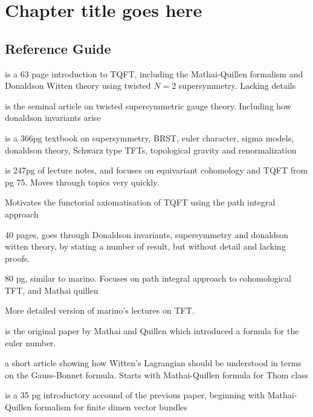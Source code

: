 
\chapter{Chapter title goes here}
\label{chapter1}
\section{Reference Guide}
\cite{cernTQFT} is a 63 page introduction to TQFT, including the Mathai-Quillen
formalism and Donaldson Witten theory using twisted $N=2$ supersymmetry.
Lacking details

\cite{wittenTQFT} is the seminal article on twisted supersymmetric gauge theory.
Including how donaldson invariants arise

\cite{birminghamTFT} is a 366pg textbook on supersymmetry, BRST, euler
character, sigma models, donaldson theory, Schwarz type TFTs, topological
gravity and renormalization

\cite{cordes95} is 247pg of lecture notes, and focuses on equivariant cohomology
and TQFT from pg 75. Moves through topics very quickly.

\cite{axiomTQFTintro} Motivates the functorial axiomatisation of TQFT using the
path integral approach

\cite{marino} 40 pages, goes through Donaldson invariants, supersymmetry and donaldson
witten theory, by stating a number of result, but without detail and lacking
proofs. 

\cite{moore} 80 pg, similar to marino. Focuses on path integral approach to
cohomological TFT, and Mathai quillen

\cite{TQFTbook} More detailed version of marino's lectures on TFT. 

\cite{MQformula} is the original paper by Mathai and Quillen which introduced a
formula for the euler number.

\cite{atiyahlagrangians} a short article showing how Witten's Lagrangian should
be understood in terms on the Gauss-Bonnet formula. Starts with Mathai-Quillen
formula for Thom class

\cite{MQintro} is a 35 pg introductory accound of the previous paper, beginning
with Mathai-Quillen formalism for finite dimen vector bundles

